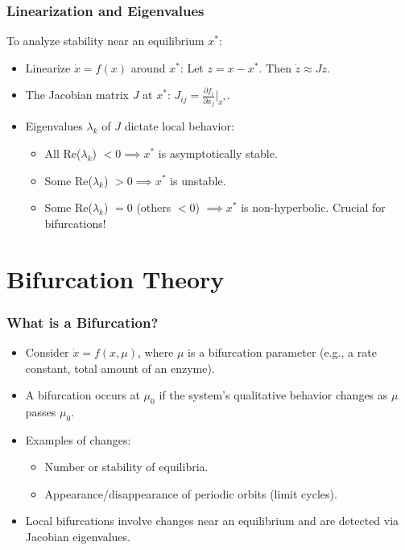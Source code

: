 \documentclass[aspectratio=169]{beamer}
\begin{document}
\begin{frame}{\insertsectionhead}
	\frametitle{Linearization and Eigenvalues}
	To analyze stability near an equilibrium $x^*$:
	\begin{itemize}
		\item \alert{Linearize} $\dot{x}=f(x)$ around $x^*$: Let $z = x - x^*$. Then $\dot{z} \approx J z$.
		\item The \alert{Jacobian matrix} $J$ at $x^*$: $J_{ij} = \frac{\partial f_i}{\partial x_j} \bigg|_{x^*}$.
		\item \alert{Eigenvalues $\lambda_k$} of $J$ dictate local behavior:
			\begin{itemize}
				\item All Re($\lambda_k$) $< 0 \implies x^*$ is asymptotically stable.
				\item Some Re($\lambda_k$) $> 0 \implies x^*$ is unstable.
				\item Some Re($\lambda_k$) $= 0$ (others $<0$) $\implies x^*$ is non-hyperbolic. \alert{Crucial for bifurcations!}
			\end{itemize}
	\end{itemize}
\end{frame}

\section{Bifurcation Theory}

\begin{frame}{\insertsectionhead}
	\frametitle{What is a Bifurcation?}
	\begin{itemize}
		\item Consider $\dot{x} = f(x, \mu)$, where $\mu$ is a \alert{bifurcation parameter} (e.g., a rate constant, total amount of an enzyme).
		\item A \alert{bifurcation} occurs at $\mu_0$ if the system's qualitative behavior changes as $\mu$ passes $\mu_0$.
		\item Examples of changes:
			\begin{itemize}
				\item Number or stability of equilibria.
				\item Appearance/disappearance of \alert{periodic orbits (limit cycles)}.
			\end{itemize}
		\item \alert{Local bifurcations} involve changes near an equilibrium and are detected via Jacobian eigenvalues.
	\end{itemize}
\end{frame}
\end{document}
